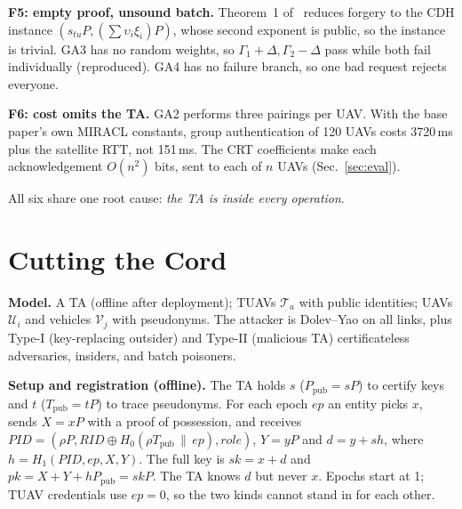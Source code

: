 \documentclass[conference]{IEEEtran}
\newcommand{\Ppub}{P_{\mathrm{pub}}}
\newcommand{\Tpub}{T_{\mathrm{pub}}}
\newcommand{\PID}{\mathit{PID}}
\newcommand{\RID}{\mathit{RID}}
\newcommand{\pk}{\mathit{pk}}
\newcommand{\sk}{\mathit{sk}}
\newcommand{\ep}{\mathit{ep}}
\newcommand{\cat}{\,\|\,}
\begin{document}
\textbf{F5: empty proof, unsound batch.} Theorem~1 of~\cite{base} reduces forgery to the CDH instance $(s_{tu}P,(\sum\upsilon_i\xi_i)P)$, whose second exponent is
public, so the instance is trivial. GA3 has no random weights, so $\Gamma_1+\Delta,\Gamma_2-\Delta$ pass while both fail individually (reproduced). GA4 has no
failure branch, so one bad request rejects everyone.

\textbf{F6: cost omits the TA.} GA2 performs three pairings per UAV. With the base paper's own MIRACL constants, group authentication of 120 UAVs costs
3720\,ms plus the satellite RTT, not 151\,ms. The CRT coefficients make each acknowledgement $O(n^2)$ bits, sent to each of $n$ UAVs (Sec.~\ref{sec:eval}).

All six share one root cause: \emph{the TA is inside every operation}.

\section{Cutting the Cord}\label{sec:design}
\textbf{Model.} A TA (offline after deployment); TUAVs $\mathcal T_a$ with public identities; UAVs $\mathcal U_i$ and vehicles $\mathcal V_j$ with pseudonyms.
The attacker is Dolev--Yao on all links, plus Type-I (key-replacing outsider) and Type-II (malicious TA) certificateless adversaries, insiders, and batch poisoners.

\textbf{Setup and registration (offline).} The TA holds $s$ ($\Ppub=sP$) to certify keys and $t$ ($\Tpub=tP$) to trace pseudonyms. For each epoch $\ep$ an
entity picks $x$, sends $X=xP$ with a proof of possession, and receives $\PID=(\rho P,\RID\oplus H_0(\rho\Tpub\cat\ep),\mathit{role})$, $Y=yP$ and
$d=y+sh$, where $h=H_1(\PID,\ep,X,Y)$. The full key is $\sk=x+d$ and $\pk=X+Y+h\Ppub=\sk P$. The TA knows $d$ but never $x$. Epochs start at 1; TUAV credentials use
$\ep=0$, so the two kinds cannot stand in for each other.
\end{document}
